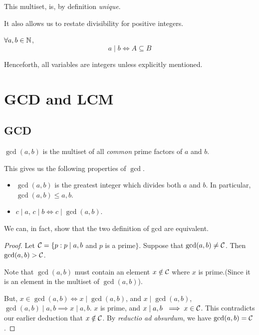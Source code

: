 \begin{remark}
	This multiset, is, by definition \textit{unique}.
\end{remark}

It also allows us to restate divisibility for positive integers.

\begin{theorem}
	\(\forall a, b \in \mathbb N\), \[a \mid b \iff A \subseteq B \]
\end{theorem}

\begin{remark}
	Henceforth, all variables are integers unless explicitly mentioned.
\end{remark}

\section{GCD and LCM}

\subsection{GCD}

\begin{definition}
	\( \gcd(a,b)\) is the multiset of all \textit{common} prime factors of \(a\) and \(b\).
\end{definition}

This gives us the following properties of \(\gcd\).

\begin{proposition}
	\hfill
	\begin{itemize}
		\item \(\gcd(a,b)\) is the greatest integer which divides both \(a\) and \(b\). In particular, \(\gcd(a,b) \le a, b\).
		\item \(c \mid a\), \(c \mid b \iff c \mid \gcd(a,b)\).
	\end{itemize}
\end{proposition}

We can, in fact, show that the two definition of gcd are equivalent. 

\begin{proof}
	Let \( \mathcal C = \{p : p \mid a, b \) and \(p \) is a prime\( \} \). Suppose that \(\gcd(a,b) \ne \mathcal C \). Then \( \gcd(a,b) > \mathcal C \). 
	\\
	\par
	Note that \( \gcd(a,b)\) must contain an element \(x \notin \mathcal C \) where \(x\) is prime.(Since it is an element in the multiset of \(\gcd(a,b)\)). 
	\par
	But, \(x \in \gcd(a,b) \iff x \mid \gcd(a,b)\), and \(x \mid \gcd(a,b) \), \(\gcd(a,b) \mid a, b \implies x \mid a,b\). \(x\) is prime, and \(x \mid a,b\ \implies x \in \mathcal C\). This contradicts our earlier deduction that \(x \notin \mathcal C\). By \textit{reductio ad absurdum}, we have \(\gcd(a,b) = \mathcal C \).
\end{proof}

